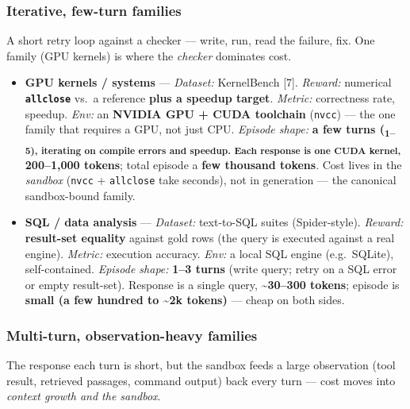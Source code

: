 \documentclass[
  paper=a4,
  ,captions=tableheading
]{scrartcl}
\providecommand{\tightlist}{%
  \setlength{\itemsep}{0pt}\setlength{\parskip}{0pt}}
\begin{document}
\hypertarget{iterative-few-turn-families}{%
\subsubsection{Iterative, few-turn
families}\label{iterative-few-turn-families}}

A short retry loop against a checker --- write, run, read the failure,
fix. One family (GPU kernels) is where the \emph{checker} dominates
cost.

\begin{itemize}
\tightlist
\item
  \textbf{GPU kernels / systems} --- \emph{Dataset:} KernelBench
  {[}7{]}. \emph{Reward:} numerical \textbf{\texttt{allclose}} vs.~a
  reference \textbf{plus a speedup target}. \emph{Metric:} correctness
  rate, speedup. \emph{Env:} an \textbf{NVIDIA GPU + CUDA toolchain}
  (\texttt{nvcc}) --- the one family that requires a GPU, not just CPU.
  \emph{Episode shape:} \textbf{a few turns
  (\textsubscript{1--5)\textbf{, iterating on compile errors and
  speedup. Each response is one CUDA kernel, }}200--1,000 tokens}; total
  episode a \textbf{few thousand tokens}. Cost lives in the
  \emph{sandbox} (\texttt{nvcc} + \texttt{allclose} take seconds), not
  in generation --- the canonical sandbox-bound family.
\item
  \textbf{SQL / data analysis} --- \emph{Dataset:} text-to-SQL suites
  (Spider-style). \emph{Reward:} \textbf{result-set equality} against
  gold rows (the query is executed against a real engine).
  \emph{Metric:} execution accuracy. \emph{Env:} a local SQL engine
  (e.g.~SQLite), self-contained. \emph{Episode shape:} \textbf{1--3
  turns} (write query; retry on a SQL error or empty result-set).
  Response is a single query, \textbf{\textasciitilde30--300 tokens};
  episode is \textbf{small (a few hundred to \textasciitilde2k tokens)}
  --- cheap on both sides.
\end{itemize}

\hypertarget{multi-turn-observation-heavy-families}{%
\subsubsection{Multi-turn, observation-heavy
families}\label{multi-turn-observation-heavy-families}}

The response each turn is short, but the sandbox feeds a large
observation (tool result, retrieved passages, command output) back every
turn --- cost moves into \emph{context growth and the sandbox}.
\end{document}
